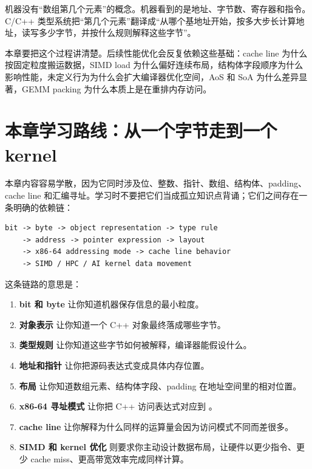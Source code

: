 \begin{keyidea}
机器没有“数组第几个元素”的概念。机器看到的是地址、字节数、寄存器和指令。C/C++ 类型系统把“第几个元素”翻译成“从哪个基地址开始，按多大步长计算地址，读写多少字节，并按什么规则解释这些字节”。
\end{keyidea}

本章要把这个过程讲清楚。后续性能优化会反复依赖这些基础：cache line 为什么按固定粒度搬运数据，SIMD load 为什么偏好连续布局，结构体字段顺序为什么影响性能，未定义行为为什么会扩大编译器优化空间，AoS 和 SoA 为什么差异显著，GEMM packing 为什么本质上是在重排内存访问。

\section{本章学习路线：从一个字节走到一个 kernel}

本章内容容易学散，因为它同时涉及位、整数、指针、数组、结构体、padding、cache line 和汇编寻址。学习时不要把它们当成孤立知识点背诵；它们之间存在一条明确的依赖链：

\begin{lstlisting}
bit -> byte -> object representation -> type rule
    -> address -> pointer expression -> layout
    -> x86-64 addressing mode -> cache line behavior
    -> SIMD / HPC / AI kernel data movement
\end{lstlisting}

这条链路的意思是：

\begin{enumerate}
  \item \textbf{bit 和 byte} 让你知道机器保存信息的最小粒度。
  \item \textbf{对象表示} 让你知道一个 C++ 对象最终落成哪些字节。
  \item \textbf{类型规则} 让你知道这些字节如何被解释，编译器能假设什么。
  \item \textbf{地址和指针} 让你把源码表达式变成具体内存位置。
  \item \textbf{布局} 让你知道数组元素、结构体字段、padding 在地址空间里的相对位置。
  \item \textbf{x86-64 寻址模式} 让你把 C++ 访问表达式对应到 。
  \item \textbf{cache line} 让你解释为什么同样的运算量会因为访问模式不同而差很多。
  \item \textbf{SIMD 和 kernel 优化} 则要求你主动设计数据布局，让硬件以更少指令、更少 cache miss、更高带宽效率完成同样计算。
\end{enumerate}

